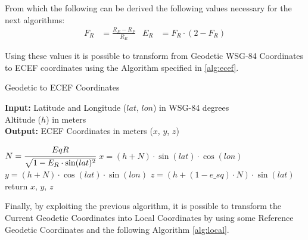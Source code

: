 From which the following can be derived the following values necessary for the next algorithms:
\begin{align}
    F_R &= \frac{R_E - R_P}{R_E} &
    E_R &= F_R \cdot (2-F_R)
\end{align}

Using these values it is possible to transform from Geodetic WSG-84 Coordinates to ECEF coordinates using the  Algorithm specified in \ref{alg:ecef}.


\begin{algorithm}[H]
\caption{Geodetic to ECEF Coordinates }
\label{alg:ecef}
  \hspace*{\algorithmicindent} \textbf{Input:} Latitude and Longitude ($lat$, $lon$) in WSG-84 degrees\\
  \hspace*{4em} Altitude ($h$) in meters\\
  \hspace*{\algorithmicindent} \textbf{Output:} ECEF Coordinates in meters ($x$, $y$, $z$)
  \begin{algorithmic}[1]
  \STATE $N = \cfrac{EqR}{\sqrt{1 - E_R \cdot \sin(lat)^2}}$
  \STATE $x = (h + N) \cdot \sin(lat) \cdot \cos(lon)$
  \STATE $y = (h + N) \cdot \cos(lat) \cdot \sin(lon)$
  \STATE $z = (h + (1 - e\_sq) \cdot N) \cdot \sin(lat)$
  \STATE return $x$, $y$, $z$
    \end{algorithmic}
\end{algorithm}

Finally, by exploiting the previous algorithm, it is possible to transform the Current Geodetic Coordinates into Local Coordinates by using some Reference Geodetic Coordinates and the following Algorithm \ref{alg:local}.

